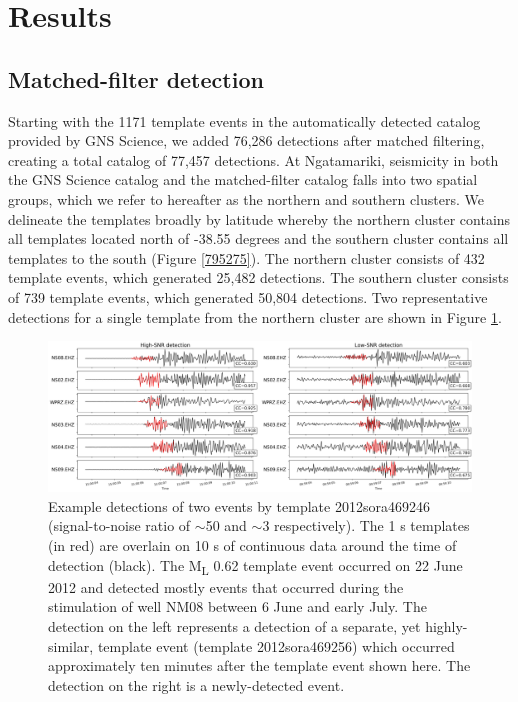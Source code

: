 \section{Results}
\subsection{Matched-filter detection}\label{MF-results}
Starting with the 1171 template events in the automatically detected catalog provided by GNS Science, we added 76,286 detections after matched filtering, creating a total catalog of 77,457 detections. At Ngatamariki, seismicity in both the GNS Science catalog and the matched-filter catalog falls into two spatial groups, which we refer to hereafter as the northern and southern clusters. We delineate the templates broadly by latitude whereby the northern cluster contains all templates located north of -38.55 degrees and the southern cluster contains all templates to the south (Figure \ref{795275}). The northern cluster consists of 432 template events, which generated 25,482 detections. The southern cluster consists of 739 template events, which generated 50,804 detections. Two representative detections for a single template from the northern cluster are shown in Figure \ref{971628}.

\begin{figure}[h!]
\begin{center}
\includegraphics[width=0.95\columnwidth]{Chapter_3_Nga/figures/2012sora453983_20120619_051750460000/det_example_publication}
\caption[Matched-filter detected waveforms at two signal-to-noise ratios]{{
Example detections of two events by template 2012sora469246
(signal-to-noise ratio of $\sim$50 and $\sim$3
respectively). The 1 s templates (in red) are overlain on 10 s of
continuous data around the time of detection (black). The
M\textsubscript{L} 0.62 template event occurred on 22 June 2012 and
detected mostly events that occurred during the \gls{stimulation} of well NM08
between 6 June and early July. The detection on the left represents a
detection of a separate, yet highly-similar, template event (template
2012sora469256) which occurred approximately ten minutes after the
template event shown here. The detection on the right is a
newly-detected event.
{\label{971628}}%
}}
\end{center}
\end{figure}


